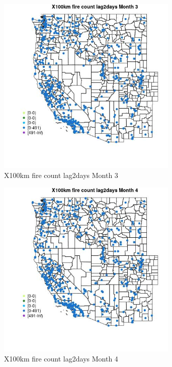 \begin{figure} 
\centering  
\includegraphics[width=0.77\textwidth]{Code_Outputs/Report_ML_input_PM25_Step4_part_e_de_duplicated_aves_compiled_2019-05-14wNAs_MapObsMo3X100km_fire_count_lag2days.jpg} 
\caption{\label{fig:Report_ML_input_PM25_Step4_part_e_de_duplicated_aves_compiled_2019-05-14wNAsMapObsMo3X100km_fire_count_lag2days}X100km fire count lag2days Month 3} 
\end{figure} 
 

\begin{figure} 
\centering  
\includegraphics[width=0.77\textwidth]{Code_Outputs/Report_ML_input_PM25_Step4_part_e_de_duplicated_aves_compiled_2019-05-14wNAs_MapObsMo4X100km_fire_count_lag2days.jpg} 
\caption{\label{fig:Report_ML_input_PM25_Step4_part_e_de_duplicated_aves_compiled_2019-05-14wNAsMapObsMo4X100km_fire_count_lag2days}X100km fire count lag2days Month 4} 
\end{figure} 
 

